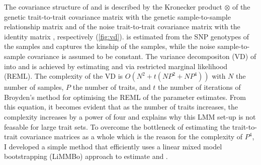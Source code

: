 The covariance structure of  and \tmat{\Psi} is described by the Kronecker product $\otimes$ of the genetic trait-to-trait covariance matrix with the genetic sample-to-sample relationship matrix  and of the noise trait-to-trait covariance matrix   with the identity matrix , respectively (\cref{fig:vd}).   is estimated from the SNP genotypes of the samples and captures the kinship of the samples, while the noise sample-to-sample covariance is assumed to be constant. The variance decompositon (VD) of  into  and \tmat{\Psi} is achieved by estimating  and  via restricted marginal likelihood (REML). The complexity of the VD is \(O(N^2 + t(NP^2 + NP^4))\) with \(N\) the number of samples, \(P\) the number of traits, and \(t\) the number of iterations of Broyden's method for optimising the REML of the parameter estimates. From this equation, it becomes evident that as the number of traits increases, the complexity increases by a power of four and explains why this LMM set-up is not feasable for large trait sets. To overcome the bottleneck of estimating the trait-to-trait covariance matrices as a whole which is the reason for the complexity of \(P^4\), I developed a simple method that efficiently uses a linear mixed model bootstrapping (LiMMBo) approach to estimate  and .